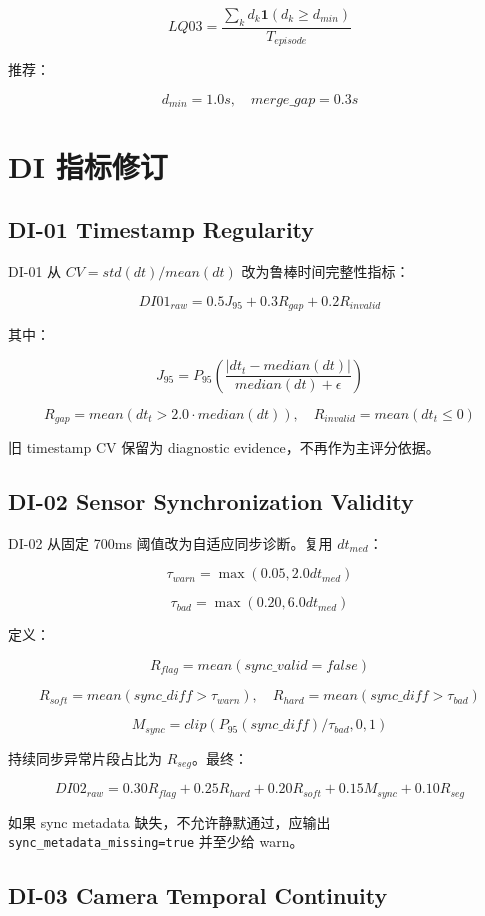 \documentclass[UTF8,zihao=-4,oneside,openany]{ctexrep}
\newcommand{\Code}[1]{\texttt{#1}}
\begin{document}
\[
LQ03=\frac{\sum_k d_k\mathbf1(d_k\ge d_{min})}{T_{episode}}
\]

推荐：

\[
d_{min}=1.0s,\quad merge\_gap=0.3s
\]

\section{DI 指标修订}

\subsection{DI-01 Timestamp Regularity}

DI-01 从 \(CV=std(dt)/mean(dt)\) 改为鲁棒时间完整性指标：

\[
DI01_{raw}=0.5J_{95}+0.3R_{gap}+0.2R_{invalid}
\]

其中：

\[
J_{95}=P_{95}\left(\frac{|dt_t-median(dt)|}{median(dt)+\epsilon}\right)
\]

\[
R_{gap}=mean(dt_t>2.0\cdot median(dt)),\quad R_{invalid}=mean(dt_t\le0)
\]

旧 timestamp CV 保留为 diagnostic evidence，不再作为主评分依据。

\subsection{DI-02 Sensor Synchronization Validity}

DI-02 从固定 700ms 阈值改为自适应同步诊断。复用 \(dt_{med}\)：

\[
\tau_{warn}=\max(0.05,2.0dt_{med})
\]

\[
\tau_{bad}=\max(0.20,6.0dt_{med})
\]

定义：

\[
R_{flag}=mean(sync\_valid=false)
\]

\[
R_{soft}=mean(sync\_diff>\tau_{warn}),\quad R_{hard}=mean(sync\_diff>\tau_{bad})
\]

\[
M_{sync}=clip(P_{95}(sync\_diff)/\tau_{bad},0,1)
\]

持续同步异常片段占比为 \(R_{seg}\)。最终：

\[
DI02_{raw}=0.30R_{flag}+0.25R_{hard}+0.20R_{soft}+0.15M_{sync}+0.10R_{seg}
\]

如果 sync metadata 缺失，不允许静默通过，应输出 \Code{sync\_metadata\_missing=true} 并至少给 warn。

\subsection{DI-03 Camera Temporal Continuity}
\end{document}
